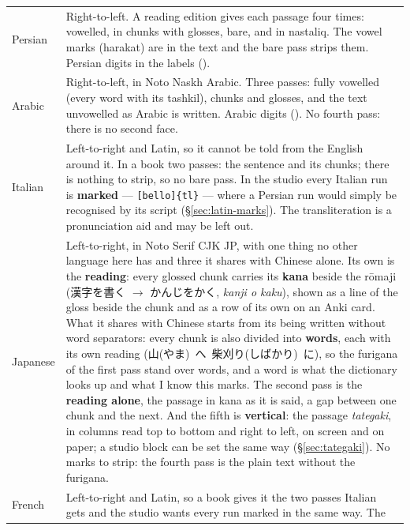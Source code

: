\documentclass[11pt,oneside]{report}
\newcommand{\pw}[1]{\babelsublr{\mbox{\foreignlanguage{persian}{#1}}}}
\newcommand{\aw}[1]{\babelsublr{\mbox{\foreignlanguage{arabic}{#1}}}}
\newcommand{\jw}[1]{\mbox{\foreignlanguage{japanese}{#1}}}
\newcommand{\menu}[1]{\textsf{#1}}
\begin{document}
\begin{center}
\begin{longtable}{@{}p{}p{}@{}}
\toprule
\textsf{Persian} & Right-to-left. A reading edition gives each passage four
  times: vowelled, in chunks with glosses, bare, and in nastaliq. The
  vowel marks (harakat) are in the text and the bare pass strips them.
  Persian digits in the labels (\pw{۳.۱}). \\
\addlinespace
\textsf{Arabic} & Right-to-left, in Noto Naskh Arabic. Three passes:
  fully vowelled (every word with its tashkil), chunks and glosses, and the
  text unvowelled as Arabic is written. Arabic digits (\aw{٣.١}). No
  fourth pass: there is no second face. \\
\addlinespace
\textsf{Italian} & Left-to-right and Latin, so it cannot be told from the
  English around it. In a book two passes: the sentence and its chunks; there
  is nothing to strip, so no bare pass. In the studio every Italian run is
  \textbf{marked} --- \texttt{[bello]\{tl\}} --- where a Persian run would
  simply be recognised by its script (\S\ref{sec:latin-marks}). The
  transliteration is a pronunciation aid and may be left out. \\
\addlinespace
\textsf{Japanese} & Left-to-right, in Noto Serif CJK JP, with one thing no
  other language here has and three it shares with Chinese alone. Its own is
  the \textbf{reading}: every glossed chunk carries its
  \textbf{kana} beside the r\=omaji (\jw{漢字を書く} $\rightarrow$
  \jw{かんじをかく}, \emph{kanji o kaku}), shown as a line of the gloss beside
  the chunk and as a row of its own on an Anki card. What it shares with
  Chinese starts from its being written without word separators: every chunk
  is also divided into \textbf{words}, each with its own reading
  (\jw{山(やま) へ 柴刈り(しばかり) に}), so the furigana of the first pass
  stand over words, and a word is what the dictionary looks up and what
  \menu{I know this} marks. The second pass is the \textbf{reading alone}, the
  passage in kana as it is said, a gap between one chunk and the next. And
  the fifth is \textbf{vertical}: the passage \emph{tategaki}, in columns read
  top to bottom and right to left, on screen and on paper; a studio block can
  be set the same way (\S\ref{sec:tategaki}). No marks to strip: the fourth
  pass is the plain text without the furigana. \\
\addlinespace
\textsf{French} & Left-to-right and Latin, so a book gives it the two passes
  Italian gets and the studio wants every run marked in the same way. The

\end{longtable}
\end{center}
\end{document}
